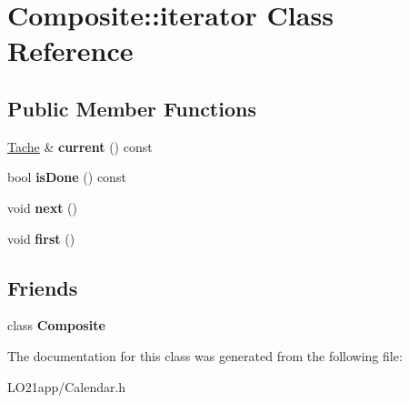 \hypertarget{class_composite_1_1iterator}{}\section{Composite\+:\+:iterator Class Reference}
\label{class_composite_1_1iterator}
\subsection*{Public Member Functions}
\begin{DoxyCompactItemize}
\item 
\hypertarget{class_composite_1_1iterator_aa5b6cb21a09480750f9a4d6f58c1d113}{}\hyperlink{class_tache}{Tache} \& {\bfseries current} () const \label{class_composite_1_1iterator_aa5b6cb21a09480750f9a4d6f58c1d113}

\item 
\hypertarget{class_composite_1_1iterator_a6e63e8c910e09fd8944bc29f6de15aa1}{}bool {\bfseries is\+Done} () const \label{class_composite_1_1iterator_a6e63e8c910e09fd8944bc29f6de15aa1}

\item 
\hypertarget{class_composite_1_1iterator_a6e4cc2fa35408408fa6dbd95507bb1b4}{}void {\bfseries next} ()\label{class_composite_1_1iterator_a6e4cc2fa35408408fa6dbd95507bb1b4}

\item 
\hypertarget{class_composite_1_1iterator_a222c5f6fe4e2dcc25e39700d3d50daae}{}void {\bfseries first} ()\label{class_composite_1_1iterator_a222c5f6fe4e2dcc25e39700d3d50daae}

\end{DoxyCompactItemize}
\subsection*{Friends}
\begin{DoxyCompactItemize}
\item 
\hypertarget{class_composite_1_1iterator_ace19a20e83d0e04d1929284108a7582d}{}class {\bfseries Composite}\label{class_composite_1_1iterator_ace19a20e83d0e04d1929284108a7582d}

\end{DoxyCompactItemize}


The documentation for this class was generated from the following file\+:\begin{DoxyCompactItemize}
\item 
L\+O21app/Calendar.\+h\end{DoxyCompactItemize}
